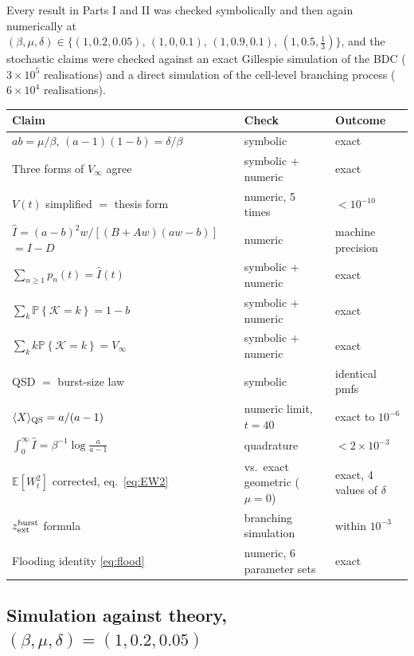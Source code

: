 \documentclass[11pt]{article}
\newcommand{\E}{\mathbb{E}}
\newcommand{\Prob}[1]{\mathbb{P}\!\left\{#1\right\}}
\newcommand{\wt}{W_t}
\newcommand{\Ihat}{\widehat{I}}
\newcommand{\Kb}{\mathcal{K}}
\newcommand{\Aa}{A}
\newcommand{\Bb}{B}
\theoremstyle{plain}
\theoremstyle{definition}
\theoremstyle{remark}
\begin{document}
Every result in Parts I and II was checked symbolically and then again numerically at
$(\beta,\mu,\delta)\in\{(1,0.2,0.05),\,(1,0,0.1),\,(1,0.9,0.1),\,(1,0.5,\tfrac13)\}$,
and the stochastic claims were checked against an exact Gillespie simulation of the BDC
($3\times10^5$ realisations) and a direct simulation of the cell-level branching process
($6\times10^4$ realisations).

\begin{center}
\renewcommand{\arraystretch}{1.3}
\begin{tabular}{@{}lll@{}}
\toprule
Claim & Check & Outcome \\
\midrule
$ab=\mu/\beta$, $(a-1)(1-b)=\delta/\beta$ & symbolic & exact \\
Three forms of $V_\infty$ agree & symbolic + numeric & exact \\
$V(t)$ simplified $=$ thesis form & numeric, 5 times & $<10^{-10}$ \\
$\Ihat=(a-b)^2w/[(\Bb+\Aa w)(aw-b)]$ $=I-D$ & numeric & machine precision \\
$\sum_{n\ge1}p_n(t)=\Ihat(t)$ & symbolic + numeric & exact \\
$\sum_k\Prob{\Kb=k}=1-b$ & symbolic + numeric & exact \\
$\sum_k k\Prob{\Kb=k}=V_\infty$ & symbolic + numeric & exact \\
QSD $=$ burst-size law & symbolic & identical pmfs \\
$\langle X\rangle_{\rm QS}=a/(a-1)$ & numeric limit, $t=40$ & exact to $10^{-6}$ \\
$\int_0^\infty\Ihat=\beta^{-1}\log\frac{a}{a-1}$ & quadrature & $<2\times10^{-3}$ \\
$\E[\wt^2]$ corrected, eq.~\eqref{eq:EW2} & vs.\ exact geometric ($\mu=0$) & exact,
4 values of $\delta$ \\
$z_{\rm ext}^{\rm burst}$ formula & branching simulation & within $10^{-3}$ \\
Flooding identity \eqref{eq:flood} & numeric, 6 parameter sets & exact \\
\bottomrule
\end{tabular}
\end{center}

\subsection*{Simulation against theory, $(\beta,\mu,\delta)=(1,0.2,0.05)$}
\end{document}
